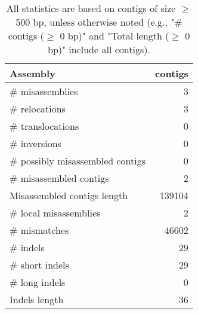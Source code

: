 \documentclass[12pt,a4paper]{article}
\begin{document}
\begin{table}[ht]
\begin{center}
\caption{All statistics are based on contigs of size $\geq$ 500 bp, unless otherwise noted (e.g., "\# contigs ($\geq$ 0 bp)" and "Total length ($\geq$ 0 bp)" include all contigs).}
\begin{tabular}{|l*{1}{|r}|}
\hline
Assembly & contigs \\ \hline
\# misassemblies & 3 \\ \hline
\hspace{5mm}\# relocations & 3 \\ \hline
\hspace{5mm}\# translocations & 0 \\ \hline
\hspace{5mm}\# inversions & 0 \\ \hline
\# possibly misassembled contigs & 0 \\ \hline
\# misassembled contigs & 2 \\ \hline
Misassembled contigs length & 139104 \\ \hline
\# local misassemblies & 2 \\ \hline
\# mismatches & 46602 \\ \hline
\# indels & 29 \\ \hline
\hspace{5mm}\# short indels & 29 \\ \hline
\hspace{5mm}\# long indels & 0 \\ \hline
Indels length & 36 \\ \hline
\end{tabular}
\end{center}
\end{table}
\end{document}
